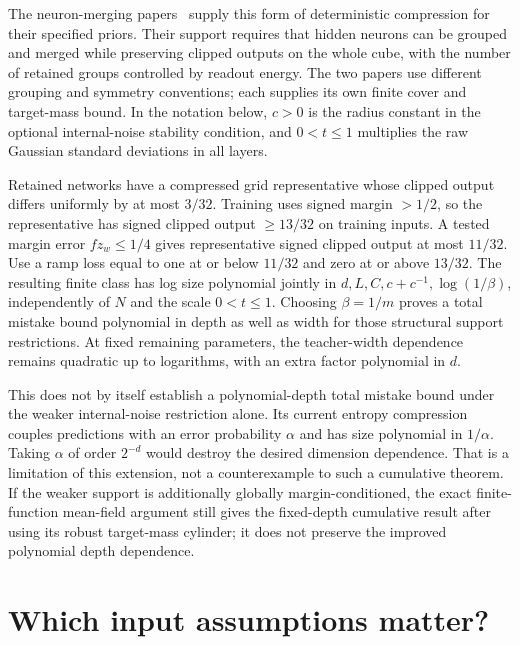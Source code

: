 \documentclass[11pt]{article}
\theoremstyle{remark}\newtheorem{remark}[theorem]{Remark}
\begin{document}
The neuron-merging papers~\cite{merging,naturality} supply this form of
deterministic compression for their specified priors. Their support
requires that hidden neurons can be grouped and merged while preserving
clipped outputs on the whole cube, with the number of retained groups
controlled by readout energy. The two papers use different grouping and
symmetry conventions; each supplies its own finite cover and target-mass
bound. In the notation below, $c>0$ is the radius constant in the optional
internal-noise stability condition, and $0<t\le1$ multiplies the raw
Gaussian standard deviations in all layers.

Retained networks have a compressed
grid representative whose clipped output differs uniformly by at most
$3/32$. Training uses signed margin $>1/2$, so the representative has
signed clipped output $\ge13/32$ on training inputs. A tested margin error
$fz_w\le1/4$ gives representative signed clipped output at most $11/32$.
Use a ramp loss equal to one at or below $11/32$ and zero at or above
$13/32$. The resulting finite class has log size polynomial jointly in
$d,L,C,c+c^{-1},\log(1/\beta)$, independently of $N$ and the scale
$0<t\le1$. Choosing $\beta=1/m$ proves a total mistake bound polynomial
in depth as well as width for those structural support restrictions.
At fixed remaining parameters, the teacher-width dependence remains
quadratic up to logarithms, with an extra factor polynomial in $d$.

This does not by itself establish a polynomial-depth total mistake bound
under the weaker internal-noise restriction alone. Its current entropy
compression couples predictions with an error probability $\alpha$ and
has size polynomial in $1/\alpha$. Taking $\alpha$ of order $2^{-d}$
would destroy the desired dimension dependence. That is a limitation of
this extension, not a counterexample to such a cumulative theorem. If the
weaker support is additionally globally margin-conditioned, the exact
finite-function mean-field argument still gives the fixed-depth cumulative
result after using its robust target-mass cylinder; it does not preserve
the improved polynomial depth dependence.

\section{Which input assumptions matter?}\label{sec:inputs}
\end{document}

